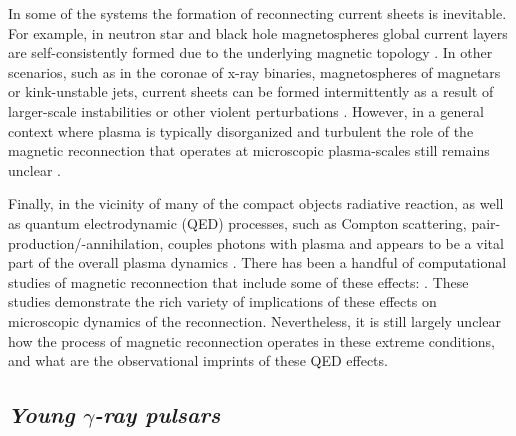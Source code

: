 In some of the systems the formation of reconnecting current sheets is inevitable. For example, in neutron star and black hole magnetospheres global current layers are self-consistently formed due to the underlying magnetic topology \citep[see, e.g.,][]{2014ApJ...785L..33P,2019PhRvL.122c5101P,2020ApJ...900..100R}. In other scenarios, such as in the coronae of x-ray binaries, magnetospheres of magnetars or kink-unstable jets, current sheets can be formed intermittently as a result of larger-scale instabilities or other violent perturbations \citep[see, e.g.,][]{2008ApJ...682..608U,2017ApJ...850..141B,2020ApJ...900L..21Y,2020ApJ...896L..31D}. However, in a general context where plasma is typically disorganized and turbulent the role of the magnetic reconnection that operates at microscopic plasma-scales still remains unclear \citep{2017PhRvL.118e5103Z,2018PhRvL.121y5101C}. 



Finally, in the vicinity of many of the compact objects radiative reaction, as well as quantum electrodynamic (QED) processes, such as Compton scattering, pair-production/-annihilation, couples photons with plasma and appears to be a vital part of the overall plasma dynamics \citep[for a review see][]{2011SSRv..160...45U}. There has been a handful of computational studies of magnetic reconnection that include some of these effects: \cite{2018JPlPh..84c7501N, 2019MNRAS.482L..60W, 2019ApJ...877...53H, 2019ApJ...870...49S, 2020arXiv201203043N, 2021arXiv210701297M}. These studies demonstrate the rich variety of implications of these effects on microscopic dynamics of the reconnection. Nevertheless, it is still largely unclear how the process of magnetic reconnection operates in these extreme conditions, and what are the observational imprints of these QED effects. 

\subsection*{\small \it Young $\gamma$-ray pulsars}

